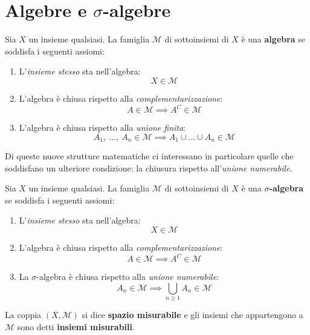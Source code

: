 \section{Algebre e $\sigma$-algebre}
\begin{define}[Algebra]
	Sia $X$ un insieme qualsiasi. La famiglia $\mathcal{M}$ di sottoinsiemi di $X$ è una \textbf{algebra}  se soddisfa i seguenti assiomi:
	\begin{enumerate}
		\item L'\textit{insieme stesso} sta nell'algebra:
		\begin{equation}
			X\in\mathcal{M}
		\end{equation}
		\item L'algebra è chiusa rispetto alla \textit{complementarizzazione}: \begin{equation}
			A\in\mathcal{M}\implies A^C\in\mathcal{M}
		\end{equation}
		\item L'algebra è chiusa rispetto alla \textit{unione finita}:
		\begin{equation}
			A_1,\ \ldots,\ A_n\in\mathcal{M}\implies A_1\cup\ldots\cup A_n\in\mathcal{M}
		\end{equation}
	\end{enumerate}
\end{define}
Di queste nuove strutture matematiche ci interessano in particolare quelle che soddisfano un ulteriore condizione: la chiusura rispetto all'\textit{unione numerabile}.
\begin{define}
	Sia $X$ un insieme qualsiasi. La famiglia $\mathcal{M}$ di sottoinsiemi di $X$ è una $\sigma$\textbf{-algebra}  se soddisfa i seguenti assiomi:
	\begin{enumerate}
		\item L'\textit{insieme stesso} sta nell'algebra:
		\begin{equation}
			X\in\mathcal{M}
		\end{equation}
		\item L'algebra è chiusa rispetto alla \textit{complementarizzazione}: \begin{equation}
			A\in\mathcal{M}\implies A^C\in\mathcal{M}
		\end{equation}
		\item La $\sigma$-algebra è chiusa rispetto alla \textit{unione numerabile}: \begin{equation}
			A_n\in\mathcal{M}\implies \bigcup_{n\geq 1}A_n\in\mathcal{M} 
		\end{equation}
	\end{enumerate}
La coppia $\left(X,\mathcal{M}\right)$ si dice \textbf{spazio misurabile} e gli insiemi che appartengono a $\mathcal{M}$ sono detti \textbf{insiemi misurabili}.
\end{define}
